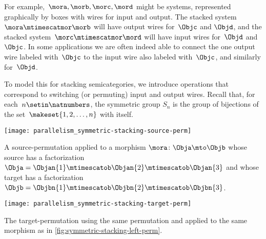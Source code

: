 For example,~$\mora, \morb, \morc, \mord$ might be systems, represented graphically by boxes with wires for input and output.
The stacked system~$\mora \mtimescatmor \morb$ will have output wires for~$\Objc$ and $\Objd$, and the stacked system~$\morc \mtimescatmor \mord$ will have input wires for~$\Objd$ and~$\Objc$.
In some applications we are often indeed able to connect the one output wire labeled with~$\Objc$ to the input wire also labeled with~$\Objc$, and similarly for~$\Objd$.

To model this for stacking semicategories, we introduce operations that correspond to switching (or permuting) input and output wires.
Recall that, for each~$n \setin \natnumbers$, the symmetric group $S_n$ is the group of bijections of the set~$\makeset{1, 2, \ldots, n }$ with itself.


\begin{marginfigure}
    \centering
    \texttt{[image: parallelism\_symmetric-stacking-source-perm]}
    \caption{A source-permutation applied to a morphism $\mora \colon \Obja \mto \Objb$ whose source has a factorization $\Obja = \Objan{1} \mtimescatob \Objan{2}  \mtimescatob \Objan{3}$ and whose target has a factorization $\Objb = \Objbn{1} \mtimescatob \Objbn{2}  \mtimescatob \Objbn{3}$.}
    \label{fig:symmetric-stacking-left-perm}
\end{marginfigure}

\begin{marginfigure}
    \centering
    \texttt{[image: parallelism\_symmetric-stacking-target-perm]}
    \caption{The target-permutation using the same permutation and applied to the same morphism as in \cref{fig:symmetric-stacking-left-perm}.}
    \label{fig:symmetric-stacking-target-perm}
\end{marginfigure}

